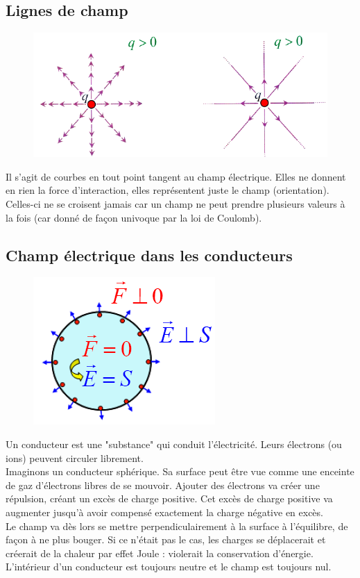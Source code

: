 \documentclass	[11pt, a4paper, openany]{book}
\begin{document}
\subsection{Lignes de champ}
\begin{figure}
\includegraphics[scale=0.34]{es/image4.png}
\end{figure}
Il s'agit de courbes en tout point tangent au champ électrique. Elles ne donnent en rien la force d'interaction, elles représentent juste le champ (orientation).\\

Celles-ci ne se croisent jamais car un champ ne peut prendre plusieurs valeurs à la fois (car donné de façon univoque par la loi de Coulomb).

\subsection{Champ électrique dans les conducteurs}
\begin{figure}
\includegraphics[scale=0.34]{es/image5.png}
\end{figure}
Un conducteur est une "substance" qui conduit l'électricité. Leurs électrons (ou ions) peuvent circuler librement.\\
Imaginons un conducteur sphérique. Sa surface peut être vue comme une enceinte de gaz d'électrons libres de se mouvoir. Ajouter des électrons va créer une répulsion, créant un excès de charge positive. Cet excès de charge positive va augmenter jusqu'à avoir compensé exactement la charge négative en excès.\\
Le champ va dès lors se mettre perpendiculairement à la surface à l'équilibre, de façon à ne plus bouger. Si ce n'était pas le cas, les charges se déplacerait et créerait de la chaleur par effet Joule : violerait la conservation d'énergie.\\
L'intérieur d'un conducteur est toujours neutre et le champ est toujours nul.
\end{document}
